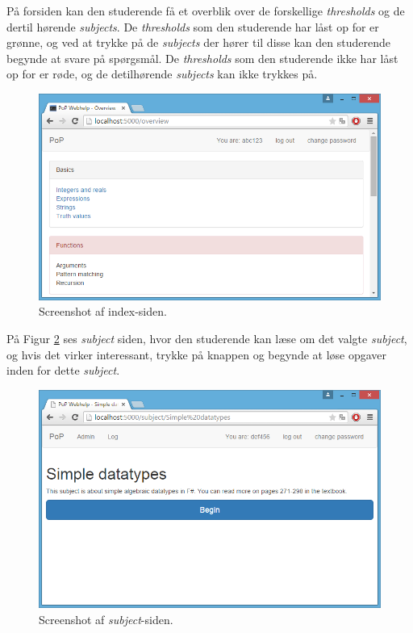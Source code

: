 \documentclass[11pt, a4paper]{article}
\begin{document}
På forsiden kan den studerende få et overblik over de forskellige \emph{thresholds} og de dertil hørende \emph{subjects}. De \emph{thresholds} som den studerende har låst op for er grønne, og ved at trykke på de \emph{subjects} der hører til disse kan den studerende begynde at svare på spørgsmål. De \emph{thresholds} som den studerende ikke har låst op for er røde, og de detilhørende \emph{subjects} kan ikke trykkes på.

\begin{figure}[htpb]
    \centering
    \includegraphics[width=1\linewidth]{figures/interface/overview.png}
    \caption{Screenshot af index-siden.}
    \label{fig:screenshot_overview}
\end{figure}

På Figur \ref{fig:screenshot_subject} ses \emph{subject} siden, hvor den studerende kan læse om det valgte \emph{subject}, og hvis det virker interessant, trykke på knappen og begynde at løse opgaver inden for dette \emph{subject}.

\begin{figure}[htpb]
    \centering
    \includegraphics[width=1\linewidth]{figures/interface/subject.png}
    \caption{Screenshot af \emph{subject}-siden.}
    \label{fig:screenshot_subject}
\end{figure}
\end{document}
